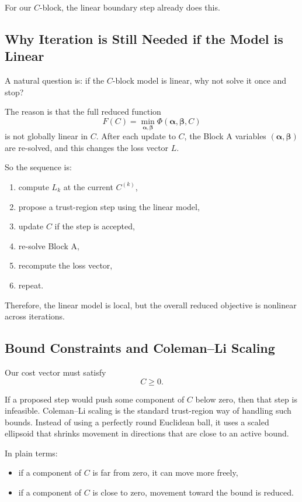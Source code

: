 \documentclass{article}
\begin{document}
For our $C$-block, the linear boundary step already does this.

\subsection{Why Iteration is Still Needed if the Model is Linear}

A natural question is: if the $C$-block model is linear, why not solve it once and stop?

The reason is that the full reduced function
\begin{equation}
 F(C) = \min_{\boldsymbol{\alpha},\boldsymbol{\beta}} \Phi(\boldsymbol{\alpha},\boldsymbol{\beta},C)
\end{equation}
is not globally linear in $C$. After each update to $C$, the Block A variables $(\boldsymbol{\alpha},\boldsymbol{\beta})$ are re-solved, and this changes the loss vector $L$.

So the sequence is:
\begin{enumerate}
    \item compute $L_k$ at the current $C^{(k)}$,
    \item propose a trust-region step using the linear model,
    \item update $C$ if the step is accepted,
    \item re-solve Block A,
    \item recompute the loss vector,
    \item repeat.
\end{enumerate}

Therefore, the linear model is local, but the overall reduced objective is nonlinear across iterations.

\subsection{Bound Constraints and Coleman--Li Scaling}

Our cost vector must satisfy
\begin{equation}
 C \geq 0.
\end{equation}

If a proposed step would push some component of $C$ below zero, then that step is infeasible. Coleman--Li scaling is the standard trust-region way of handling such bounds. Instead of using a perfectly round Euclidean ball, it uses a scaled ellipsoid that shrinks movement in directions that are close to an active bound.

In plain terms:
\begin{itemize}
    \item if a component of $C$ is far from zero, it can move more freely,
    \item if a component of $C$ is close to zero, movement toward the bound is reduced.
\end{itemize}
\end{document}
